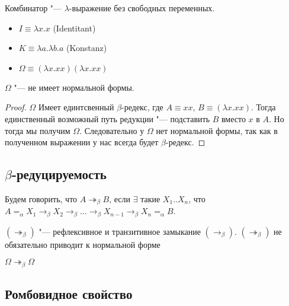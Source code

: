 \begin{definition}
	Комбинатор "--- $\lambda$-выражение без свободных переменных.
\end{definition}

\begin{definition} 
	\hfill
	\begin{itemize}
		\item $I \equiv \lambda{}x.x$ (Identitant)
		\item $K \equiv \lambda{}a.\lambda{}b.a$ (Konstanz)
		\item $\Omega \equiv (\lambda{}x.xx)(\lambda{}x.xx)$
	\end{itemize}
\end{definition}

\begin{lemma}
	$\Omega$ "--- не имеет нормальной формы.
\end{lemma}

\begin{proof}
	$\Omega$ Имеет единтсвенный $\beta$-редекс, где $A \equiv xx$, $B \equiv (\lambda{}x.xx)$. Тогда единственный возможный путь редукции "--- подставить $B$ вместо $x$ в $A$. Но тогда мы получим $\Omega$. Следовательно у $\Omega$ нет нормальной формы, так как в полученном выражении у нас всегда будет $\beta$-редекс.
\end{proof}

\subsection{$\beta$-редуцируемость}

\begin{definition}
	Будем говорить, что $A\twoheadrightarrow_{\beta}B$, если $\exists$ такие $X_{1}..X_{n}$, что $A=_{\alpha}X_{1}\to_{\beta}X_{2}\to_{\beta}...\to_{\beta}X_{n-1}\to_{\beta}X_{n}=_{\alpha}B$.
\end{definition}

$(\twoheadrightarrow_{\beta})$ "--- рефлексивное и транзитивное замыкание $(\to_{\beta})$. $(\twoheadrightarrow_{\beta})$ не обязательно приводит к нормальной форме
\begin{example}
	$\Omega\twoheadrightarrow_{\beta}\Omega$
\end{example}

\subsection{Ромбовидное свойство}

